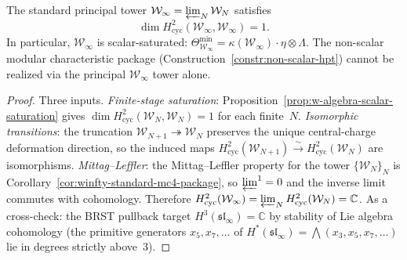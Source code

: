 \begin{corollary}
\label{cor:winfty-scalar-saturation}
The standard principal tower
$\mathcal{W}_\infty = \varprojlim_N \mathcal{W}_N$ satisfies
\[
\dim H^2_{\mathrm{cyc}}(\mathcal{W}_\infty, \mathcal{W}_\infty)
= 1.
\]
In particular, $\mathcal{W}_\infty$ is scalar-saturated:
$\Theta_{\mathcal{W}_\infty}^{\min}
= \kappa(\mathcal{W}_\infty) \cdot \eta \otimes \Lambda$.
The non-scalar modular characteristic package
\textup{(}Construction~\textup{\ref{constr:non-scalar-hpt})}
cannot be realized via the principal
$\mathcal{W}_\infty$ tower alone.
\end{corollary}

\begin{proof}
Three inputs.
\emph{Finite-stage saturation}:
Proposition~\ref{prop:w-algebra-scalar-saturation} gives
$\dim H^2_{\mathrm{cyc}}(\mathcal{W}_N, \mathcal{W}_N) = 1$
for each finite~$N$.
\emph{Isomorphic transitions}:
the truncation $\mathcal{W}_{N+1} \twoheadrightarrow \mathcal{W}_N$
preserves the unique central-charge deformation direction, so the
induced maps
$H^2_{\mathrm{cyc}}(\mathcal{W}_{N+1})
\xrightarrow{\sim}
H^2_{\mathrm{cyc}}(\mathcal{W}_N)$
are isomorphisms.
\emph{Mittag--Leffler}:
the Mittag--Leffler property for the tower
$\{\mathcal{W}_N\}_N$ is
Corollary~\ref{cor:winfty-standard-mc4-package}, so
$\varprojlim^1 = 0$ and the inverse limit commutes with
cohomology.
Therefore
$H^2_{\mathrm{cyc}}(\mathcal{W}_\infty)
= \varprojlim_N H^2_{\mathrm{cyc}}(\mathcal{W}_N)
= \mathbb{C}$.
As a cross-check: the BRST pullback target
$H^3(\mathfrak{sl}_\infty) = \mathbb{C}$
by stability of Lie algebra cohomology
(the primitive generators $x_5, x_7, \ldots$ of
$H^*(\mathfrak{sl}_\infty)
= \bigwedge(x_3, x_5, x_7, \ldots)$
lie in degrees strictly above~$3$).
\end{proof}

